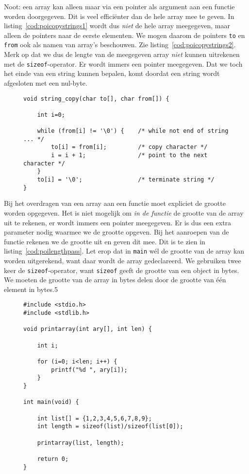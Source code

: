 Noot: een array kan alleen maar via een pointer als argument aan een functie worden doorgegeven. Dit is veel efficiënter dan de hele array mee te geven. In listing~\ref{cod:poicopystrings1} wordt dus \textsl{niet} de hele array meegegeven, maar alleen de pointers naar de eerste elementen. We mogen daarom de pointers \texttt{to} en \texttt{from} ook als namen van array's beschouwen.  Zie listing~\ref{cod:poicopystrings2}. Merk op dat we dus de lengte van de meegegeven array \textsl{niet} kunnen uitrekenen met de \texttt{sizeof}-operator. Er wordt immers een pointer meegegeven. Dat we toch het einde van een string kunnen bepalen, komt doordat een string wordt afgesloten met een nul-byte.

\begin{figure}[!ht]
\begin{lstlisting}[caption=Functie voor het kopieren van een string.,label=cod:poicopystrings2]
void string_copy(char to[], char from[]) {

    int i=0;

    while (from[i] != '\0') {    /* while not end of string ... */
        to[i] = from[i];         /* copy character */
        i = i + 1;               /* point to the next character */
    }
    to[i] = '\0';                /* terminate string */
}
\end{lstlisting}
\end{figure}

Bij het overdragen van een array aan een functie moet expliciet de grootte worden opgegeven. Het is niet mogelijk om \textsl{in de functie} de grootte van de array uit te rekenen, er wordt immers een pointer meegegeven. Er is dus een extra parameter nodig waarmee we de grootte opgeven. Bij het aanroepen van de functie rekenen we de grootte uit en geven dit mee. Dit is te zien in listing~\ref{cod:poilengthpass}. Let erop dat in \texttt{main} w\'el de grootte van de array kan worden uitgerekend, want daar wordt de array gedeclareerd. We gebruiken twee keer de \texttt{sizeof}-operator, want \texttt{sizeof} geeft de grootte van een object in bytes. We moeten de grootte van de array in bytes delen door de grootte van \'e\'en element in bytes.5

\begin{figure}[!ht]
\begin{lstlisting}[caption=Meegeven van de grootte van een array.,label=cod:poilengthpass]
#include <stdio.h>
#include <stdlib.h>

void printarray(int ary[], int len) {

    int i;

    for (i=0; i<len; i++) {
        printf("%d ", ary[i]);
    }
}

int main(void) {

    int list[] = {1,2,3,4,5,6,7,8,9};
    int length = sizeof(list)/sizeof(list[0]);

    printarray(list, length);

    return 0;
}
\end{lstlisting}
\end{figure}

